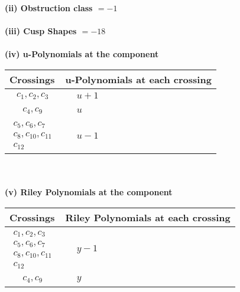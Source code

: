 \documentclass[1p]{elsarticle_modified}
\theoremstyle{definition}
\begin{document}
\flushleft \textbf{(ii) Obstruction class $= -1$}\\~\\
\flushleft \textbf{(iii) Cusp Shapes $= -18$}\\~\\
\newpage\renewcommand{\arraystretch}{1}
\flushleft \textbf{(iv) u-Polynomials at the component}\newline \\
\begin{tabular}{m{50pt}|m{274pt}}
Crossings & \hspace{64pt}u-Polynomials at each crossing \\
\hline $$\begin{aligned}c_{1},c_{2},c_{3}\end{aligned}$$&$\begin{aligned}
&u+1
\end{aligned}$\\
\hline $$\begin{aligned}c_{4},c_{9}\end{aligned}$$&$\begin{aligned}
&u
\end{aligned}$\\
\hline $$\begin{aligned}c_{5},c_{6},c_{7}\\c_{8},c_{10},c_{11}\\c_{12}\end{aligned}$$&$\begin{aligned}
&u-1
\end{aligned}$\\
\hline
\end{tabular}\\~\\
\newpage\renewcommand{\arraystretch}{1}
\flushleft \textbf{(v) Riley Polynomials at the component}\newline \\
\begin{tabular}{m{50pt}|m{274pt}}
Crossings & \hspace{64pt}Riley Polynomials at each crossing \\
\hline $$\begin{aligned}c_{1},c_{2},c_{3}\\c_{5},c_{6},c_{7}\\c_{8},c_{10},c_{11}\\c_{12}\end{aligned}$$&$\begin{aligned}
&y-1
\end{aligned}$\\
\hline $$\begin{aligned}c_{4},c_{9}\end{aligned}$$&$\begin{aligned}
&y
\end{aligned}$\\
\hline
\end{tabular}\\~\\
\end{document}
